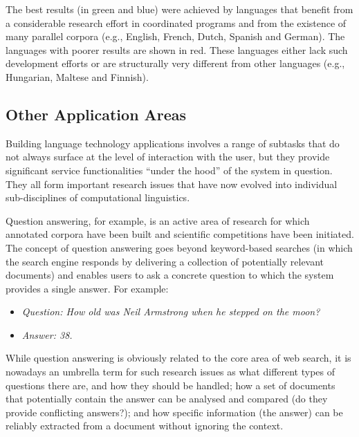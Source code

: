 \begin{multicols}{2}
The best results (in green and blue) were achieved by languages that benefit from a considerable research effort in coordinated programs and from the existence of many parallel corpora (e.g., English, French, Dutch, Spanish and German). The languages with poorer results are shown in red. These languages either lack such development efforts or are structurally very different from other languages (e.g., Hungarian, Maltese and Finnish).

\subsection{Other Application Areas}


Building language technology applications involves a range of subtasks that do not always surface at the level of interaction with the user, but they provide significant service functionalities “under the hood” of the system in question. They all form important research issues that have now evolved into individual sub-disciplines of computational linguistics. 

Question answering, for example, is an active area of research for which annotated corpora have been built and scientific competitions have been initiated. The concept of question answering goes beyond keyword-based searches (in which the search engine responds by delivering a collection of potentially relevant documents) and enables users to ask a concrete question to which the system provides a single answer. For example:

\begin{itemize}
\item[] \textit{Question: How old was Neil Armstrong when he stepped on the moon?}
\item[] \textit{Answer: 38.}
\end{itemize}

While question answering is obviously related to the core area of web search, it is nowadays an umbrella term for such research issues as what different types of questions there are, and how they should be handled; how a set of documents that potentially contain the answer can be analysed and compared (do they provide conflicting answers?); and how specific information (the answer) can be reliably extracted from a document without ignoring the context. 


\end{multicols}

